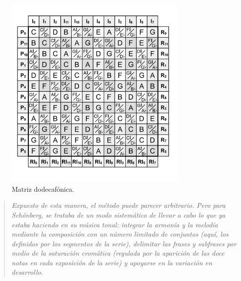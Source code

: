 \documentclass[a4paper,openany,oneside,12pt]{book}
\begin{document}
\begin{figure}
\centering
\includegraphics[width=0.8\textwidth]{img/12_tone_matrix.jpg} 
\caption{Matriz dodecafónica. \cite{musictheory}} \label{fig:matrix}
\end{figure}

\begin{quote}
\em Expuesto de esta manera, el método puede parecer arbitrario. Pero para Schönberg, se trataba de un modo sistemático de llevar a cabo lo que ya estaba haciendo en su música tonal: integrar la armonía y la melodía mediante la composición con un número limitado de conjuntos (aquí, los definidos por los segmentos de la serie), delimitar las frases y subfrases por medio de la saturación cromática (regulada por la aparición de las doce notas en cada exposición de la serie) y apoyarse en la variación en desarrollo. \cite{palisca}
\end{quote}
\end{document}
